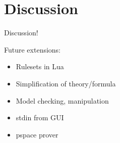 \section{Discussion}

Discussion!

Future extensions:
\begin{itemize}
\item Rulesets in Lua
\item Simplification of theory/formula
\item Model checking, manipulation
\item stdin from GUI
\item {\sc pspace} prover
\end{itemize}
